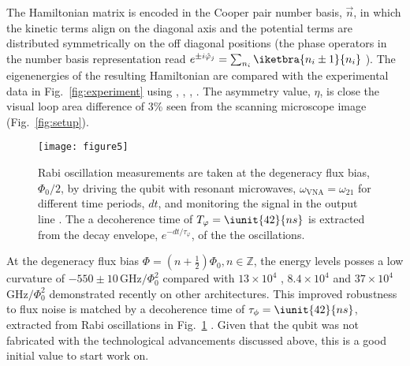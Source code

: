 The Hamiltonian matrix is encoded in the Cooper pair number basis, $\vec{n} $, in
which the kinetic  terms align on the  diagonal axis and the  potential terms are
distributed symmetrically on  the off diagonal positions (the  phase operators in
the            number             basis            representation            read
$ e^{\pm i\hat{\varphi}_j} = \sum_{n_i}\iketbra{n_i\pm1}{n_i}$ \cite{phase}). The
eigenenergies of  the resulting  Hamiltonian are  compared with  the experimental
data  in Fig.~\ref{fig:experiment}  using ,  , ,  .  The asymmetry
value, $ \eta  $, is close the visual  loop area difference of 3\%  seen from the
scanning microscope image (Fig.~\ref{fig:setup}).
 
 \begin{figure}[h!]
   \texttt{[image: figure5]}
   \caption{Rabi oscillation measurements are taken  at the degeneracy flux bias,
     $   \Phi_0/2   $,  by   driving   the   qubit  with   resonant   microwaves,
     $\omega_{\text{VNA}} = \omega_{21}$ for different  time periods, $ dt $, and
     monitoring the signal in the output line \cite{rabi}. The a decoherence time
     of $  T_\varphi =  \iunit{42}{ns} $  is extracted  from the  decay envelope,
     $ e^{-dt/\tau_\varphi} $, of the the oscillations. \label{fig:rabi}}
 \end{figure}

 At the degeneracy flux bias $  \Phi = (n + \frac{1}{2})\Phi_0, n\in\mathbb{Z} $,
 the energy levels  posses a low curvature of  $ -550\pm10\,\text{GHz}/\Phi_0^2 $
 compared  with   $  13\times   10^4$  \cite{stern2014},   $  8.4   \times  10^4$
 \cite{zhu2010}     and     $      37\times     10^{4}$     \cite{gustavsson2012}
 $  \text{GHz}/\Phi_0^2$  demonstrated  recently  on  other  architectures.  This
 improved  robustness  to  flux  noise  is  matched  by  a  decoherence  time  of
 $  \tau_\phi   =  \iunit{42}{ns}   $,  extracted   from  Rabi   oscillations  in
 Fig.~\ref{fig:rabi} \cite{rabi}.  Given that the  qubit was not  fabricated with
 the technological advancements discussed above, this  is a good initial value to
 start work on.

